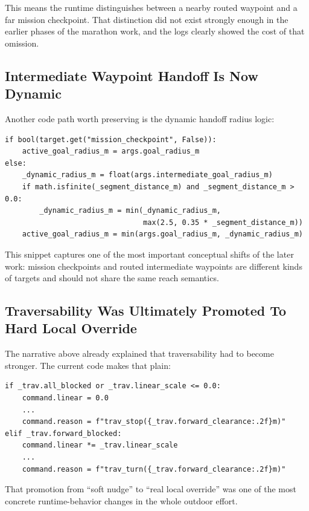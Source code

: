 \documentclass[11pt]{article}
\begin{document}
This means the runtime distinguishes between a nearby routed waypoint and a far mission checkpoint. That distinction did not exist strongly enough in the earlier phases of the marathon work, and the logs clearly showed the cost of that omission.

\subsection{Intermediate Waypoint Handoff Is Now Dynamic}
Another code path worth preserving is the dynamic handoff radius logic:
\begin{verbatim}
if bool(target.get("mission_checkpoint", False)):
    active_goal_radius_m = args.goal_radius_m
else:
    _dynamic_radius_m = float(args.intermediate_goal_radius_m)
    if math.isfinite(_segment_distance_m) and _segment_distance_m > 0.0:
        _dynamic_radius_m = min(_dynamic_radius_m,
                                max(2.5, 0.35 * _segment_distance_m))
    active_goal_radius_m = min(args.goal_radius_m, _dynamic_radius_m)
\end{verbatim}

This snippet captures one of the most important conceptual shifts of the later work: mission checkpoints and routed intermediate waypoints are different kinds of targets and should not share the same reach semantics.

\subsection{Traversability Was Ultimately Promoted To Hard Local Override}
The narrative above already explained that traversability had to become stronger. The current code makes that plain:
\begin{verbatim}
if _trav.all_blocked or _trav.linear_scale <= 0.0:
    command.linear = 0.0
    ...
    command.reason = f"trav_stop({_trav.forward_clearance:.2f}m)"
elif _trav.forward_blocked:
    command.linear *= _trav.linear_scale
    ...
    command.reason = f"trav_turn({_trav.forward_clearance:.2f}m)"
\end{verbatim}

That promotion from ``soft nudge'' to ``real local override'' was one of the most concrete runtime-behavior changes in the whole outdoor effort.
\end{document}
